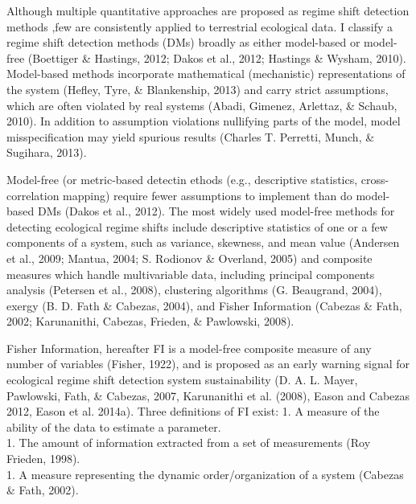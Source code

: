 \documentclass[12pt,twoside,openany]{reedthesis}
\begin{document}
Although multiple quantitative approaches are proposed as regime shift
detection methods ,few are consistently applied to terrestrial
ecological data. I classify a regime shift detection methods (DMs)
broadly as either model-based or model-free (Boettiger \& Hastings,
2012; Dakos et al., 2012; Hastings \& Wysham, 2010). Model-based methods
incorporate mathematical (mechanistic) representations of the system
(Hefley, Tyre, \& Blankenship, 2013) and carry strict assumptions, which
are often violated by real systems (Abadi, Gimenez, Arlettaz, \& Schaub,
2010). In addition to assumption violations nullifying parts of the
model, model misspecification may yield spurious results (Charles T.
Perretti, Munch, \& Sugihara, 2013).

Model-free (or metric-based detectin ethods (e.g., descriptive
statistics, cross-correlation mapping) require fewer assumptions to
implement than do model-based DMs (Dakos et al., 2012). The most widely
used model-free methods for detecting ecological regime shifts include
descriptive statistics of one or a few components of a system, such as
variance, skewness, and mean value (Andersen et al., 2009; Mantua, 2004;
S. Rodionov \& Overland, 2005) and composite measures which handle
multivariable data, including principal components analysis (Petersen et
al., 2008), clustering algorithms (G. Beaugrand, 2004), exergy (B. D.
Fath \& Cabezas, 2004), and Fisher Information (Cabezas \& Fath, 2002;
Karunanithi, Cabezas, Frieden, \& Pawlowski, 2008).

Fisher Information, hereafter FI is a model-free composite measure of
any number of variables (Fisher, 1922), and is proposed as an early
warning signal for ecological regime shift detection system
sustainability (D. A. L. Mayer, Pawlowski, Fath, \& Cabezas, 2007,
Karunanithi et al. (2008), Eason and Cabezas 2012, Eason et al. 2014a).
Three definitions of FI exist: 1. A measure of the ability of the data
to estimate a parameter.\\
1. The amount of information extracted from a set of measurements (Roy
Frieden, 1998).\\
1. A measure representing the dynamic order/organization of a system
(Cabezas \& Fath, 2002).
\end{document}
